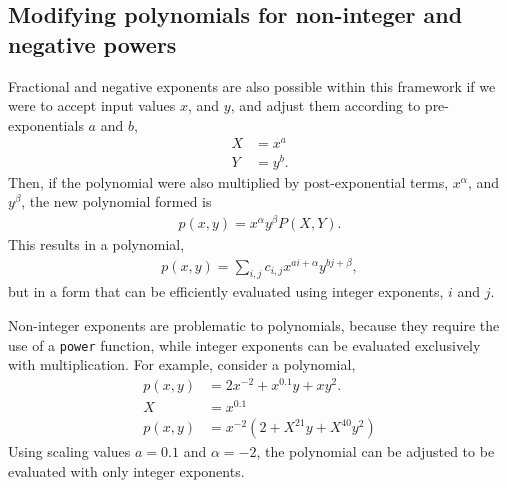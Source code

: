 \subsection{Modifying polynomials for non-integer and negative powers}
Fractional and negative exponents are also possible within this framework if we were to accept input values $x$, and $y$, and adjust them according to pre-exponentials $a$ and $b$,
\begin{align}
X &= x^a\\
Y &= y^b.
\end{align}
Then, if the polynomial were also multiplied by post-exponential terms, $x^\alpha$, and $y^\beta$, the new polynomial formed is
\begin{align}
p(x,y) = x^\alpha y^\beta P(X,Y).
\end{align}
This results in a polynomial,
\begin{align}
p(x,y) = \sum_{i,j} c_{i,j} x^{ai+\alpha} y^{bj+\beta},\label{eqn:num:pxy}
\end{align}
but in a form that can be efficiently evaluated using integer exponents, $i$ and $j$.

Non-integer exponents are problematic to polynomials, because they require the use of a \texttt{power} function, while integer exponents can be evaluated exclusively with multiplication.  For example, consider a polynomial,
\begin{align}
p(x,y) &= 2x^{-2} + x^{0.1}y + xy^2.\nonumber\\
X &= x^{0.1}\nonumber\\
p(x,y) &= x^{-2}\left(2 + X^{21}y + X^{40}y^2 \right)\nonumber
\end{align}
Using scaling values $a = 0.1$ and $\alpha = -2$, the polynomial can be adjusted to be evaluated with only integer exponents.  

